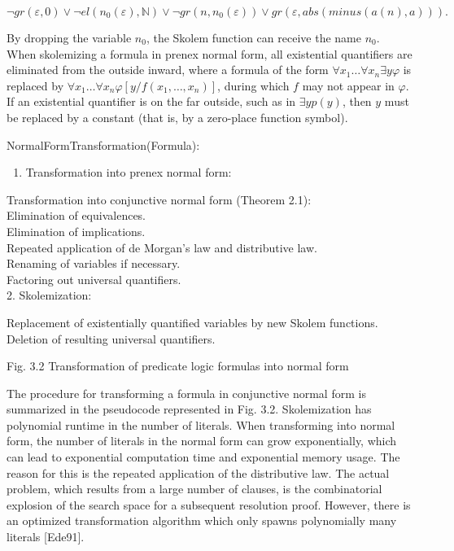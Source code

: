 \documentclass[10pt]{article}
\begin{document}
$$
\neg g r(\varepsilon, 0) \vee \neg e l\left(n_{0}(\varepsilon), \mathbb{N}\right) \vee \neg g r\left(n, n_{0}(\varepsilon)\right) \vee g r(\varepsilon, a b s(m i n u s(a(n), a))) .
$$

By dropping the variable $n_{0}$, the Skolem function can receive the name $n_{0}$.\\
When skolemizing a formula in prenex normal form, all existential quantifiers are eliminated from the outside inward, where a formula of the form $\forall x_{1} \ldots \forall x_{n} \exists y \varphi$ is replaced by $\forall x_{1} \ldots \forall x_{n} \varphi\left[y / f\left(x_{1}, \ldots, x_{n}\right)\right]$, during which $f$ may not appear in $\varphi$. If an existential quantifier is on the far outside, such as in $\exists y p(y)$, then $y$ must be replaced by a constant (that is, by a zero-place function symbol).

\begin{displayquote}
NormalFormTransformation(Formula):

\begin{enumerate}
  \item Transformation into prenex normal form:
\end{enumerate}
\end{displayquote}

\begin{displayquote}
Transformation into conjunctive normal form (Theorem 2.1):\\
Elimination of equivalences.\\
Elimination of implications.\\
Repeated application of de Morgan's law and distributive law.\\
Renaming of variables if necessary.\\
Factoring out universal quantifiers.\\
2. Skolemization:
\end{displayquote}

\begin{displayquote}
Replacement of existentially quantified variables by new Skolem functions.\\
Deletion of resulting universal quantifiers.
\end{displayquote}

Fig. 3.2 Transformation of predicate logic formulas into normal form

The procedure for transforming a formula in conjunctive normal form is summarized in the pseudocode represented in Fig. 3.2. Skolemization has polynomial runtime in the number of literals. When transforming into normal form, the number of literals in the normal form can grow exponentially, which can lead to exponential computation time and exponential memory usage. The reason for this is the repeated application of the distributive law. The actual problem, which results from a large number of clauses, is the combinatorial explosion of the search space for a subsequent resolution proof. However, there is an optimized transformation algorithm which only spawns polynomially many literals [Ede91].
\end{document}
